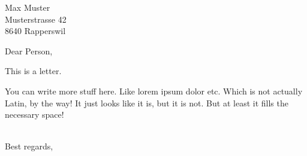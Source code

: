 \documentclass[SN,11pt,enlargefirstpage=true,sps]{scrlttr2}
\begin{document}
\begin{letter}{Max Muster\\Musterstrasse 42\\8640 Rapperswil}

  \opening{Dear Person,}

	This is a letter.

	You can write more stuff here. Like lorem ipsum dolor etc. Which is not
	actually Latin, by the way! It just looks like it is, but it is not. But at
	least it fills the necessary space!

  \closing{\\Best regards,}

\end{letter}
\end{document}
